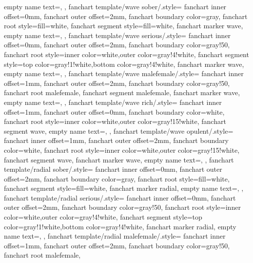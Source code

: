 {{        empty name text={},
      },
%
    fanchart template/wave sober/.style=
      {
        fanchart inner offset={0mm},
        fanchart outer offset={2mm},
        fanchart boundary color=gray,
        fanchart root style={fill=white},
        fanchart segment style={fill=white},
        fanchart marker wave,
        empty name text={},
      },
    fanchart template/wave serious/.style=
      {
        fanchart inner offset={0mm},
        fanchart outer offset={2mm},
        fanchart boundary color=gray!50,
        fanchart root style={inner color=white,outer color=gray!4!white},
        fanchart segment style={top color=gray!1!white,bottom color=gray!4!white},
        fanchart marker wave,
        empty name text={},
      },
    fanchart template/wave malefemale/.style=
      {
        fanchart inner offset={1mm},
        fanchart outer offset={2mm},
        fanchart boundary color=gray!50,
        fanchart root malefemale,
        fanchart segment malefemale,
        fanchart marker wave,
        empty name text={},
      },
    fanchart template/wave rich/.style=
      {
        fanchart inner offset={1mm},
        fanchart outer offset={0mm},
        fanchart boundary color=white,
        fanchart root style={inner color=white,outer color=gray!15!white},
        fanchart segment wave,
        empty name text={},
      },
    fanchart template/wave opulent/.style=
      {
        fanchart inner offset={1mm},
        fanchart outer offset={2mm},
        fanchart boundary color=white,
        fanchart root style={inner color=white,outer color=gray!15!white},
        fanchart segment wave,
        fanchart marker wave,
        empty name text={},
      },
    fanchart template/radial sober/.style=
      {
        fanchart inner offset={0mm},
        fanchart outer offset={2mm},
        fanchart boundary color=gray,
        fanchart root style={fill=white},
        fanchart segment style={fill=white},
        fanchart marker radial,
        empty name text={},
      },
    fanchart template/radial serious/.style=
      {
        fanchart inner offset={0mm},
        fanchart outer offset={2mm},
        fanchart boundary color=gray!50,
        fanchart root style={inner color=white,outer color=gray!4!white},
        fanchart segment style={top color=gray!1!white,bottom color=gray!4!white},
        fanchart marker radial,
        empty name text={},
      },
    fanchart template/radial malefemale/.style=
      {
        fanchart inner offset={1mm},
        fanchart outer offset={2mm},
        fanchart boundary color=gray!50,
        fanchart root malefemale,
}}
